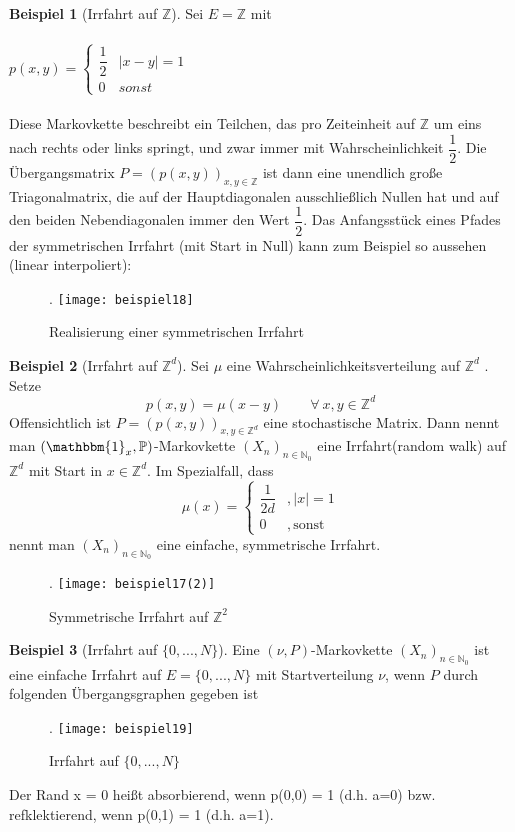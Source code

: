 \documentclass[a4paper,12pt]{scrartcl}
\theoremstyle{definition}
\newtheorem{bsp}{Beispiel}[section]
\begin{document}
\begin{bsp}[Irrfahrt auf $\mathbb{Z}$]
Sei $E = \mathbb{Z}$ mit
\\
\\
$p(x,y)=
\begin{cases}
\dfrac{1}{2} &  |x - y| = 1\\
0 & sonst
\end{cases}$
\\
\\
Diese Markovkette beschreibt ein Teilchen, das pro Zeiteinheit auf $\mathbb{Z}$ um eins nach rechts oder
links springt, und zwar immer mit Wahrscheinlichkeit $\dfrac{1}{2}$. Die Übergangsmatrix $P = (p(x,y))_{x,y \in \mathbb{Z}}$
ist dann eine unendlich große Triagonalmatrix, die auf der Hauptdiagonalen ausschließlich Nullen hat und auf den beiden Nebendiagonalen immer den Wert $\dfrac{1}{2}$.
Das Anfangsstück eines Pfades der symmetrischen Irrfahrt (mit Start in Null) kann zum Beispiel so aussehen (linear interpoliert):
\begin{figure}[H].
\centering
\texttt{[image: beispiel18]}
\caption{Realisierung einer symmetrischen Irrfahrt}
\end{figure}
\end{bsp}

\begin{bsp}[Irrfahrt auf $\mathbb{Z}^{d}$]
Sei $\mu$ eine Wahrscheinlichkeitsverteilung auf $\mathbb{Z}^{d}$ . Setze
\begin{equation*}
p(x,y) = \mu(x-y) \qquad \forall \: x,y \in \mathbb{Z}^{d}
\end{equation*}
Offensichtlich ist $P =(p(x,y))_{x,y \in \mathbb{Z}^d}$ eine stochastische Matrix. Dann nennt man $(\mathbbm{1}_{x},\mathbb{P})$-Markovkette $(X_{n})_{n \in \mathbb{N}_{0}}$ eine Irrfahrt(random walk) auf $\mathbb{Z}^{d}$ mit Start in $x \in \mathbb{Z}^{d}$. Im Spezialfall, dass
\begin{equation*}
\mu(x)=
\begin{cases}
\dfrac{1}{2d} &  ,|x|=1\\
0 & ,\mathrm{sonst}
\end{cases}
\end{equation*}
nennt man $(X_{n})_{n \in \mathbb{N}_{0}}$ eine einfache, symmetrische Irrfahrt.
\begin{figure}[H].
\centering
\texttt{[image: beispiel17(2)]}
\caption{Symmetrische Irrfahrt auf $\mathbb{Z}^2$}
\end{figure}
\end{bsp}
\begin{bsp}[Irrfahrt auf $\lbrace 0,...,N \rbrace$]
Eine $(\nu,P)$-Markovkette $(X_{n})_{n \in \mathbb{N}_{0}}$ ist eine einfache Irrfahrt auf $E = \lbrace0,...,N \rbrace$ mit Startverteilung $\nu$, wenn $P$ durch folgenden Übergangsgraphen gegeben ist
\begin{figure}[H].
\centering
\texttt{[image: beispiel19]}
\caption{Irrfahrt auf $\lbrace 0,...,N \rbrace$}
\end{figure}
\noindent
Der Rand x = 0 heißt absorbierend, wenn p(0,0) = 1 (d.h. a=0) bzw. refklektierend, wenn p(0,1) = 1 (d.h. a=1).

\end{bsp}
\end{document}
